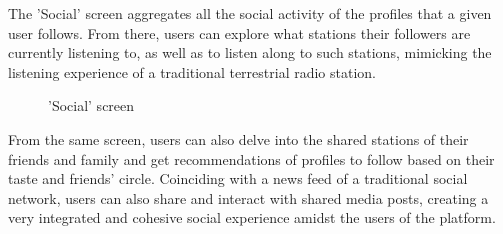 The 'Social' screen aggregates all the social activity of the profiles that a given user follows. From there, users can explore what stations their followers are currently listening to, as well as to listen along to such stations, mimicking the listening experience of a traditional terrestrial radio station. 
\begin{figure}[htbp]
	\centering
	 \qquad
	 \qquad
	\caption{'Social' screen}
	\label{fig:mfp1}
\end{figure}

From the same screen, users can also delve into the shared stations of their friends and family and get recommendations of profiles to follow based on their taste and friends' circle. Coinciding with a news feed of a traditional social network, users can also share and interact with shared media posts, creating a very integrated and cohesive social experience amidst the users of the platform.

